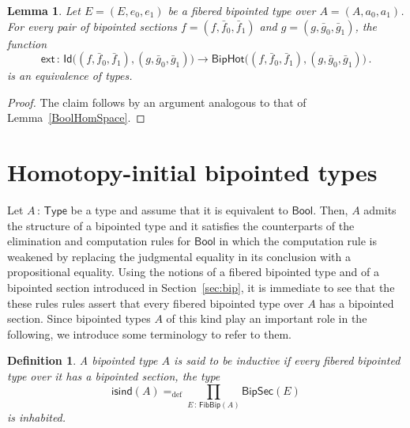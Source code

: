 \documentclass[10pt,a4paper,oneside,reqno]{amsart}
\theoremstyle{mythm}
\newtheorem{lemma}[theorem]{Lemma}
\theoremstyle{mydef}
\newtheorem{definition}[theorem]{Definition}
\theoremstyle{myrmk}
\newcommand{\ie}{\text{i.e.\ }}
\newcommand{\defeq}{=_{\mathrm{def}}}
\newcommand{\co}{\,{:}\,}
\newcommand{\isbipind}{\mathsf{isind}}
\newcommand{\ext}{\mathsf{ext}}
\newcommand{\Bool}{\mathsf{Bool}}
\newcommand{\Id}{\mathsf{Id}}
\newcommand{\U}{\mathsf{Type}}
\newcommand{\BipHot}{\mathsf{BipHot}}
\newcommand{\FibBip}{\mathsf{FibBip}}
\newcommand{\BipSec}{\mathsf{BipSec}}
\begin{document}
\begin{lemma} \label{thm:biphot}
Let $E = (E, e_0, e_1)$ be a fibered bipointed type over $A = (A, a_0, a_1)$. 
For every pair of bipointed sections $f = (f, \bar{f}_0, \bar{f}_1)$ and $g = (g, \bar{g}_0, \bar{g}_1)$, 
the function
\[
\ext \co \Id\big( (f, \bar{f}_0, \bar{f}_1), (g, \bar{g}_0, \bar{g}_1) \big) \rightarrow
\BipHot \big( (f, \bar{f}_0, \bar{f}_1), (g, \bar{g}_0, \bar{g}_1) \big) \, .
\]
is an equivalence of types. 
\end{lemma}


\begin{proof} The claim follows by an argument analogous to that of Lemma~\ref{BoolHomSpace}.
\end{proof}







\section{Homotopy-initial bipointed types} 
\label{sec:homibt}


Let $A \co \U$ be a  type and assume that it is equivalent to $\Bool$. Then, $A$ admits the structure of a bipointed type and
it satisfies the counterparts of the elimination and computation rules for $\Bool$ in which the computation rule is 
weakened by replacing the judgmental equality in its conclusion with a propositional equality. Using the notions of a fibered bipointed type and of a bipointed section introduced in Section~\ref{sec:bip}, it is immediate to see that the these rules rules assert that every fibered bipointed type over $A$ has a bipointed section. Since bipointed types $A$ of this kind  play an important role in the following, we introduce some terminology to refer to them.


 



\begin{definition} A bipointed type $A$ is said to be \emph{inductive} if every fibered bipointed type over it has a bipointed section, \ie the type
\[ 
\isbipind(A) \defeq \prod_{E \co \FibBip(A)}  \BipSec(E)
\]  
is inhabited. \end{definition} 
\end{document}
